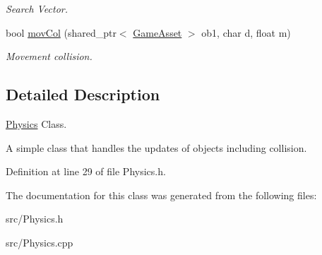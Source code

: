 \begin{DoxyCompactItemize}
\begin{DoxyCompactList}\small\item\em Search Vector. \end{DoxyCompactList}\item 
\hypertarget{classPhysics_a18d6624118907a527a1ac69878a39f95}{bool \hyperlink{classPhysics_a18d6624118907a527a1ac69878a39f95}{mov\-Col} (shared\-\_\-ptr$<$ \hyperlink{classGameAsset}{Game\-Asset} $>$ ob1, char d, float m)}\label{classPhysics_a18d6624118907a527a1ac69878a39f95}

\begin{DoxyCompactList}\small\item\em Movement collision. \end{DoxyCompactList}\end{DoxyCompactItemize}


\subsection{Detailed Description}
\hyperlink{classPhysics}{Physics} Class. 

A simple class that handles the updates of objects including collision. 

Definition at line 29 of file Physics.\-h.



The documentation for this class was generated from the following files\-:\begin{DoxyCompactItemize}
\item 
src/Physics.\-h\item 
src/Physics.\-cpp\end{DoxyCompactItemize}
